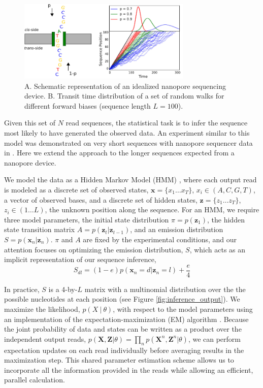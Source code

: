 \documentclass{biophys_letter}
\begin{document}
\begin{figure}%
  \centering
  \includegraphics[width=3.25in]{fig/fig1-withcartoon-jw-eps2pdf-cropped.pdf}
  \caption{A. Schematic representation of an idealized nanopore sequencing device. B. Transit time distribution of a set of random walks for different forward biases (sequence length $L=100$).}
  \label{fig:fig1}
\end{figure}

Given this set of $N$ read sequences, the statistical task is to infer the sequence most likely to have generated the observed data.
An experiment similar to this model was demonstrated on very short sequences with nanopore sequencer data in \cite{Ohshiro:2012}.
Here we extend the approach to the longer sequences expected from a nanopore device.


We model the data as a Hidden Markov Model (HMM) \cite{Rabiner:1989}, where each output read is modeled as a discrete set of observed states, $\mathbf{x}=\{x_{1}\dots x_{T}\}$, $x_i \in (A,C,G,T)$, a vector of observed bases, and a discrete set of hidden states, $\mathbf{z}=\{z_{1} \dots z_{T}\}$, $z_i \in (1 \dots L)$, the unknown position along the sequence.
For an HMM, we require three model parameters, the initial state distribution $\pi=p(\mathbf{z}_{1})$, the hidden state transition matrix $A=p(\mathbf{z}_{t}|\mathbf{z}_{t-1})$, and an emission distribution $S=p(\mathbf{x}_{n}|\mathbf{z}_{n})$. 
$\pi$ and $A$ are fixed by the experimental conditions, and our attention focuses on optimizing the emission distribution, $S$, which acts as an implicit representation of our sequence inference,
\begin{equation}
  S_{dl} = (1-e)p(\mathbf{x}_n = d |\mathbf{z}_{n} = l) + \frac{e}{4} 
\end{equation}

In practice, $S$ is a 4-by-$L$ matrix with a multinomial distribution over the the possible nucleotides at each position (see Figure \ref{fig:inference_output}).
We maximize the likelihood, $p(X \:|\: \theta)$, with respect to the model parameters using an implementation of the expectation-maximization (EM) algorithm \cite{Baum:1970}.
Because the joint probability of data and states can be written as a product over the independent output reads, $p(\mathbf{X},\mathbf{Z}|\theta)=\prod_{n}p(\mathbf{X}^n,\mathbf{Z}^n|\theta)$, we can perform expectation updates on each read individually before averaging results in the maximization step.
This shared parameter estimation scheme allows us to incorporate all the information provided in the reads while allowing an efficient, parallel calculation.
\end{document}
